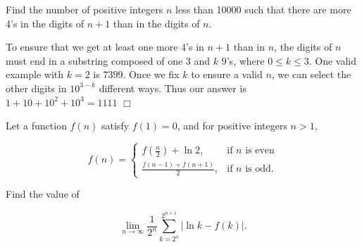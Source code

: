  \begin{problem}
     Find the number of positive integers $n$ less than 10000 such that there are more 4’s in the digits of $n+1$ than in the digits of $n$.
 \end{problem}

\begin{solution}[1,111]
    To ensure that we get at least one more $4$'s in $n+1$ than in $n$, the digits of $n$ must end in a substring composed of one $3$ and $k$ $9$'s, where $0 \leq k \leq 3$.
    One valid example with $k=2$ is $7399$. Once we fix $k$ to ensure a valid $n$, we can select the other digits in $10^{3-k}$ different ways. Thus our answer is $1+10+10^2+10^3 = 1111$ $\Box$
\end{solution}

  \begin{problem}
     Let a function \( f(n) \) satisfy \( f(1) = 0 \), and for positive integers \( n > 1 \),

    \[
    f(n) =
    \begin{cases}
    f\!\left(\frac{n}{2}\right) + \ln 2, & \text{if } n \text{ is even} \\
    \frac{f(n-1) + f(n+1)}{2}, & \text{if } n \text{ is odd}.
    \end{cases}
    \]
    
    Find the value of
    
    \[
    \lim_{n \to \infty} \frac{1}{2^n} \sum_{k=2^n}^{2^{n+1}} \big|\ln k - f(k)\big|.
    \]
 \end{problem}

